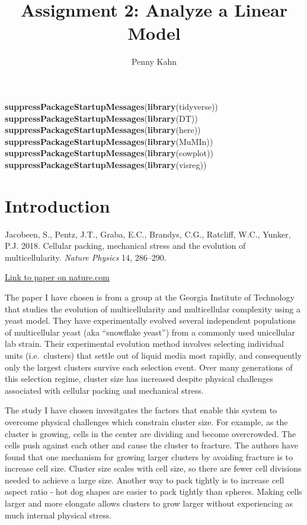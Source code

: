 \documentclass[]{article}
\title{Assignment 2: Analyze a Linear Model}
\author{Penny Kahn}
\date{}
\newenvironment{Shaded}{\begin{snugshade}}{\end{snugshade}}
\newcommand{\KeywordTok}[1]{\textcolor[rgb]{0.13,0.29,0.53}{\textbf{#1}}}
\newcommand{\NormalTok}[1]{#1}
\begin{document}
\maketitle

{
\setcounter{tocdepth}{2}
\tableofcontents
}
\begin{Shaded}
\begin{Highlighting}[]
\KeywordTok{suppressPackageStartupMessages}\NormalTok{(}\KeywordTok{library}\NormalTok{(tidyverse))}
\KeywordTok{suppressPackageStartupMessages}\NormalTok{(}\KeywordTok{library}\NormalTok{(DT))}
\KeywordTok{suppressPackageStartupMessages}\NormalTok{(}\KeywordTok{library}\NormalTok{(here))}
\KeywordTok{suppressPackageStartupMessages}\NormalTok{(}\KeywordTok{library}\NormalTok{(MuMIn))}
\KeywordTok{suppressPackageStartupMessages}\NormalTok{(}\KeywordTok{library}\NormalTok{(cowplot))}
\KeywordTok{suppressPackageStartupMessages}\NormalTok{(}\KeywordTok{library}\NormalTok{(visreg))}
\end{Highlighting}
\end{Shaded}

\section{Introduction}\label{introduction}

Jacobeen, S., Pentz, J.T., Graba, E.C., Brandys, C.G., Ratcliff, W.C.,
Yunker, P.J. 2018. Cellular packing, mechanical stress and the evolution
of multicellularity. \emph{Nature Physics} 14, 286--290.

\href{https://www.nature.com/articles/s41567-017-0002-y}{Link to paper
on nature.com}

The paper I have chosen is from a group at the Georgia Institute of
Technology that studies the evolution of multicellularity and
multicellular complexity using a yeast model. They have experimentally
evolved several independent populations of multicellular yeast (aka
``snowflake yeast'') from a commonly used unicellular lab strain. Their
experimental evolution method involves selecting individual units
(i.e.~clusters) that settle out of liquid media most rapidly, and
consequently only the largest clusters survive each selection event.
Over many generations of this selection regime, cluster size has
increased despite physical challenges associated with cellular packing
and mechanical stress.

The study I have chosen invesitgates the factors that enable this system
to overcome physical challenges which constrain cluster size. For
example, as the cluster is growing, cells in the center are dividing and
become overcrowded. The cells push against each other and cause the
cluster to fracture. The authors have found that one mechanism for
growing larger clusters by avoiding fracture is to increase cell size.
Cluster size scales with cell size, so there are fewer cell divisions
needed to achieve a large size. Another way to pack tightly is to
increase cell aspect ratio - hot dog shapes are easier to pack tightly
than spheres. Making cells larger and more elongate allows clusters to
grow larger without experiencing as much internal physical stress.
\end{document}
